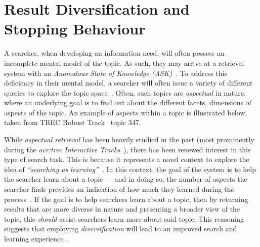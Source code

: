 
\chapter[Result Diversification and Stopping Behaviour]{Result Diversification and\\Stopping Behaviour}\label{chap:diversity}
A searcher, when developing an information need, will often possess an incomplete mental model of the topic. As such, they may arrive at a retrieval system with an \emph{Anomalous State of Knowledge (ASK)}~\citep{belkin1980ask}. To address this deficiency in their mental model, a searcher will often issue a variety of different queries to explore the topic space~\citep{kelly2015search_tasks}. Often, such topics are \emph{aspectual} in nature, where an underlying goal is to find out about the different facets, dimensions of aspects of the topic. An example of aspects within a topic is illustrated below, taken from TREC Robust Track~\citep{voorhees2006trec_robust} topic 347.

\begin{figure}[h]
    \centering
    \vspace{4mm}
    \label{fig:aspectsintro}
    \vspace{-5mm}
\end{figure}

While \emph{aspectual retrieval} has been heavily studied in the past (most prominently during the \emph{\gls{acr:trec} Interactive Tracks}~\citep{over2001trec}), there has been renewed interest in this type of search task. This is because it represents a novel context to explore the idea of \emph{``searching as learning''}~\citep{collins2017sal}. In this context, the goal of the system is to help the searcher learn about a topic~\citep{collins2017sal} -- and in doing so, the number of aspects the searcher finds provides an indication of how much they learned during the process~\citep{syed2017sal}. If the goal is to help searchers learn about a topic, then by returning results that are more diverse in nature and presenting a broader view of the topic, this \emph{should} assist searchers learn more about said topic. This reasoning suggests that employing \emph{diversification} will lead to an improved search and learning experience~\citep{syed2017sal}.

